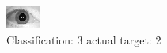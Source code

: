 \begin{figure}[h!]
\begin{center}
\includegraphics[width=0.60\columnwidth]{figures/ID1776_class_3_target_2.png}
\end{center}
\caption{ Classification: 3 actual target: 2}
\label{fig:ID1776_class_3_target_2}
\end{figure}
